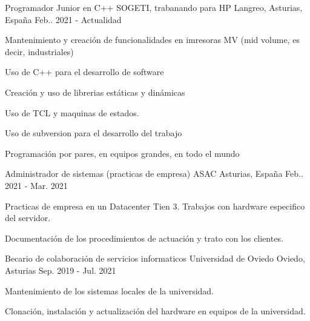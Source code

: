 

\begin{cventries}

  \cventry
    {Programador Junior en C++} %
    {SOGETI, trabanando para HP} %
    {Langreo, Asturias, España} %
    {Feb.. 2021 - Actualidad} %
    {
      \begin{cvitems} %
        \item {Mantenimiento y creación de funcionalidades en imresoras MV (mid volume, es decir, industriales)}
        \item {Uso de C++ para el desarrollo de software}
        \item {Creación y uso de librerias estáticas y dinámicas}
        \item {Uso de TCL y maquinas de estados.}
        \item {Uso de subversion para el desarrollo del trabajo}
        \item {Programación por pares, en equipos grandes, en todo el mundo}
      \end{cvitems}
    }

  \cventry
    {Administrador de sistemas (practicas de empresa)} %
    {ASAC} %
    {Asturias, España} %
    {Feb.. 2021 - Mar. 2021} %
    {
      \begin{cvitems} %
        \item {Practicas de empresa en un Datacenter Tien 3. Trabajos con hardware especifico del servidor.}
        \item {Documentación de los procedimientos de actuación y trato con los clientes.}
      \end{cvitems}
    }

  \cventry
    {Becario de colaboración de servicios informaticos} %
    {Universidad de Oviedo} %
    {Oviedo, Asturias} %
    {Sep. 2019 - Jul. 2021} %
    {
      \begin{cvitems} %
        \item {Mantenimiento de los sistemas locales de la universidad.}
        \item {Clonación, instalación y actualización del hardware en equipos de la universidad.}
      \end{cvitems}
    }

\end{cventries}
